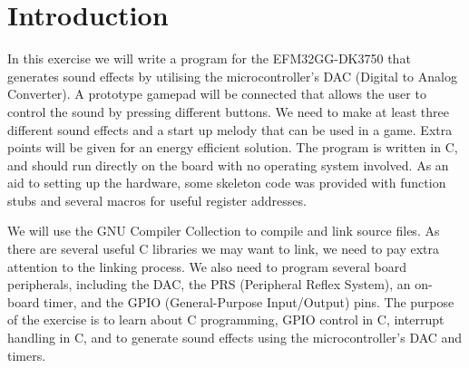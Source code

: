 \chapter{Introduction}


In this exercise we will write a program for the EFM32GG-DK3750 that generates sound effects by utilising the microcontroller's DAC (Digital to Analog Converter). A prototype gamepad will be connected that allows the user to control the sound by pressing different buttons. We need to make at least three different sound effects and a start up melody that can be used in a game. Extra points will be given for an energy efficient solution. The program is written in C, and should run directly on the board with no operating system involved. As an aid to setting up the hardware, some skeleton code was provided with function stubs and several macros for useful register addresses.

We will use the GNU Compiler Collection to compile and link source files. As there are several useful C libraries we may want to link, we need to pay extra attention to the linking process. We also need to program several board peripherals, including the DAC, the PRS (Peripheral Reflex System), an on-board timer, and the GPIO (General-Purpose Input/Output) pins. The purpose of the exercise is to learn about C programming, GPIO control in C, interrupt handling in C, and to generate sound effects using the microcontroller's DAC and timers.\cite{compendium}

